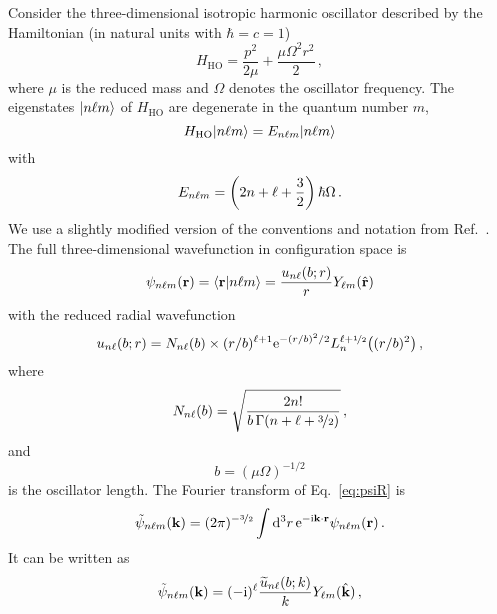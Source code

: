   Consider the three-dimensional isotropic harmonic oscillator described
  by the Hamiltonian (in natural units with $\hbar=c=1$)
  \begin{equation}
   H_\mathrm{HO} = \frac{p^2}{2\mu} + \frac{\mu\Omega^2r^2}{2} \,,
  \label{eq:H-HO}
  \end{equation}
  where $\mu$ is the reduced mass and $\Omega$ denotes the oscillator
  frequency.  The eigenstates ${|n\ell m\rangle}$ of $H_\mathrm{HO}$ are
  degenerate in the quantum number $m$,
  \begin{equation}
   H_\mathrm{HO}{|n\ell m\rangle} = E_{n\ell m}{|n\ell m\rangle}
  \label{eq:H-nlm}
  \end{equation}
  with
  \begin{equation}
   E_{n\ell m} = \left(2n+\ell+\frac32\right)\hbar\Omega \,.
  \label{eq:E-nlm}
  \end{equation}
  We use a slightly modified version of the conventions and notation
  from Ref.~\cite{Caprio:2012rv}.  The full three-dimensional wavefunction in
  configuration space is
  \begin{equation}
   \psi_{n\ell m}(\mathbf{r}) = {\langle\mathbf{r}|n\ell m\rangle}
   = \frac{u_{n\ell}(b;r)}{r}Y_{\ell m}(\hat{\mathbf{r}})
  \label{eq:psiR}
  \end{equation}
  with the reduced radial wavefunction
  \begin{equation}
   u_{n\ell}(b;r) = N_{n\ell}(b)\times(r/b)^{\ell+1} \mathrm{e}^{-(r/b)^2/2}
   L_n^{\ell+\nicefrac12}\big((r/b)^2\big) \,,
  \label{eq:uR}
  \end{equation}
  where
  \begin{equation}
   N_{n\ell}(b) = \sqrt{\frac{2n!}{b\,\Gamma(n+\ell+\nicefrac32)}} \,,
  \label{eq:N}
  \end{equation}
  and
  \begin{equation}
   b = (\mu\Omega)^{-1/2}
  \label{eq:b}
  \end{equation}
  is the oscillator length.  The Fourier transform of Eq.~\eqref{eq:psiR} is
  \begin{equation}
   \tilde{\psi}_{n\ell m}(\mathbf{k}) = (2\pi)^{-\nicefrac32} \int\mathrm{d}^3r\,
   \mathrm{e}^{-\mathrm{i}\mathbf{k}\cdot\mathbf{r}} \psi_{n\ell m}(\mathbf{r}) \,.
  \end{equation}
  It can be written as
  \begin{equation}
   \tilde{\psi}_{n\ell m}(\mathbf{k})
   = (-\mathrm{i})^\ell\frac{\widetilde{u}_{n\ell}(b;k)}{k}Y_{\ell m}(\hat{\mathbf{k}}) \,,
  \label{eq:psiK}
  \end{equation}

